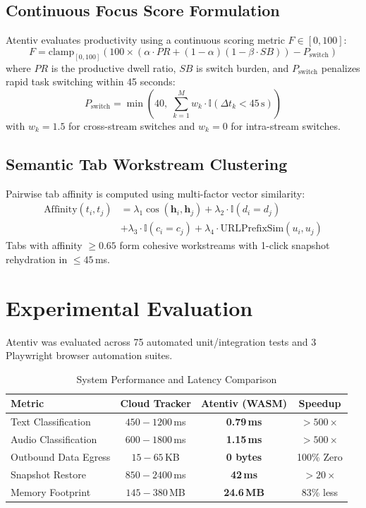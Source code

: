 \documentclass[conference]{IEEEtran}
\begin{document}
\subsection{Continuous Focus Score Formulation}
Atentiv evaluates productivity using a continuous scoring metric $F \in [0, 100]$:
\begin{equation}
F = \text{clamp}_{[0, 100]}\left( 100 \times \left( \alpha \cdot PR + (1 - \alpha)(1 - \beta \cdot SB) \right) - P_{\text{switch}} \right)
\end{equation}
where $PR$ is the productive dwell ratio, $SB$ is switch burden, and $P_{\text{switch}}$ penalizes rapid task switching within 45 seconds:
\begin{equation}
P_{\text{switch}} = \min\left(40, \; \sum_{k=1}^M w_k \cdot \mathbb{I}(\Delta t_k < 45\,\text{s})\right)
\end{equation}
with $w_k = 1.5$ for cross-stream switches and $w_k = 0$ for intra-stream switches.

\subsection{Semantic Tab Workstream Clustering}
Pairwise tab affinity is computed using multi-factor vector similarity:
\begin{align}
\text{Affinity}(t_i, t_j) &= \lambda_1 \cos(\mathbf{h}_i, \mathbf{h}_j) + \lambda_2 \cdot \mathbb{I}(d_i = d_j) \nonumber \\
&+ \lambda_3 \cdot \mathbb{I}(c_i = c_j) + \lambda_4 \cdot \text{URLPrefixSim}(u_i, u_j)
\end{align}
Tabs with affinity $\ge 0.65$ form cohesive workstreams with 1-click snapshot rehydration in $\le 45$\,ms.

\section{Experimental Evaluation}
Atentiv was evaluated across 75 automated unit/integration tests and 3 Playwright browser automation suites.

\begin{table}[h]
\caption{System Performance and Latency Comparison}
\centering
\begin{tabular}{lccc}
\toprule
Metric & Cloud Tracker & Atentiv (WASM) & Speedup \\
\midrule
Text Classification & $450 - 1200$\,ms & \textbf{0.79\,ms} & $>500\times$ \\
Audio Classification & $600 - 1800$\,ms & \textbf{1.15\,ms} & $>500\times$ \\
Outbound Data Egress & $15 - 65$\,KB & \textbf{0 bytes} & 100\% Zero \\
Snapshot Restore & $850 - 2400$\,ms & \textbf{42\,ms} & $>20\times$ \\
Memory Footprint & $145 - 380$\,MB & \textbf{24.6\,MB} & 83\% less \\
\bottomrule
\end{tabular}
\end{table}
\end{document}
